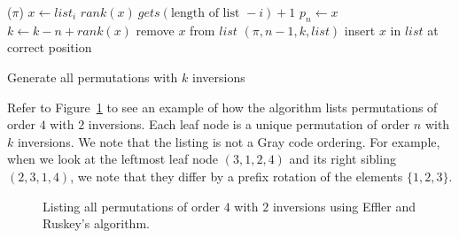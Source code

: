 \begin{algorithm}[t]
    \begin{algorithmic}[1]
                ($\pi$)
            \Else
                    \State $x \gets list_{i}$
                    \State $rank(x)\ gets (\text{length of list }- i) + 1$
                        \State $p_{n} \gets x$
                        \State $k \gets k - n + rank(x)$
                        \State remove $x$ from $list$ 
                        $(\pi, n-1, k, list)$
                        \State insert $x$ in $list$ at correct position
                    \EndIf
                \EndFor
            \EndIf
        \EndFunction
        
    \end{algorithmic}
    \caption{Generate all permutations with $k$ inversions}
    \label{Alg:KInv}
\end{algorithm} 

Refer to Figure~\ref{Fig:EfflerRuskey}\cite{A26} to see an example of how the algorithm lists permutations of order $4$ with $2$ inversions. 
Each leaf node is a unique permutation of order $n$ with $k$ inversions.
We note that the listing is not a Gray code ordering. For example, when we look at the leftmost leaf node $(3,1,2,4)$ and 
its right sibling $(2,3,1,4)$, we note that they differ by a prefix rotation of the elements $\{1,2,3\}$. 
\begin{figure}[ht]
    \centering
    \caption{Listing all permutations of order $4$ with $2$ inversions using Effler and Ruskey's algorithm.}
    \label{Fig:EfflerRuskey}
\end{figure}


